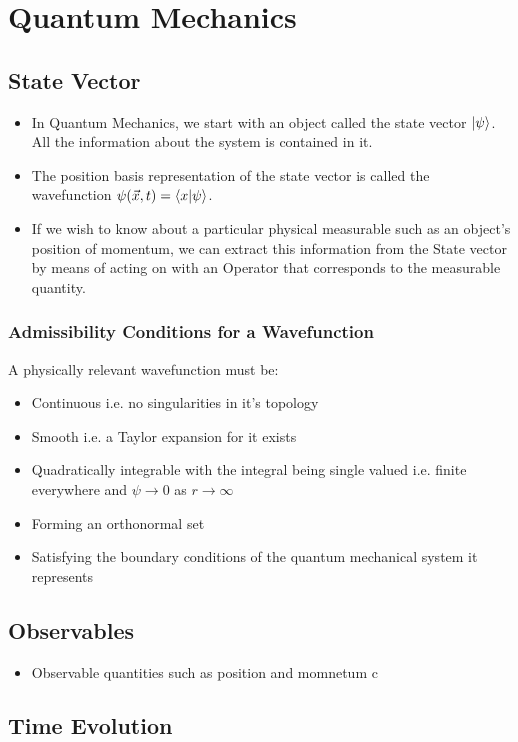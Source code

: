 \chapter{Quantum Mechanics}
\label{ch:qm}

\section{State Vector}
\begin{itemize}
\item In Quantum Mechanics, we start with an object called the state vector $\ket{\psi}$. All the information about the system is contained in it. 
\item The position basis representation of the state vector is called the wavefunction $\psi (\vec{x}, t) = \braket{x}{\psi}$.
\item If we wish to know about a particular physical measurable such as an object's position of momentum, we can extract this information from the State vector by means of acting on with an Operator that corresponds to the measurable quantity.
\end{itemize}
\subsection{Admissibility Conditions for a Wavefunction}
A physically relevant wavefunction must be:
\begin{itemize}
\item Continuous i.e. no singularities in it's topology
\item Smooth i.e. a Taylor expansion for it exists
\item Quadratically integrable with the integral being single valued i.e. finite everywhere and $\psi \rightarrow 0$ as $r \rightarrow \infty$
\item Forming an orthonormal set
\item Satisfying the boundary conditions of the quantum mechanical system it represents
\end{itemize}
\section{Observables}
\begin{itemize}
\item Observable quantities such as position and momnetum c
\end{itemize}

\section{Time Evolution}
